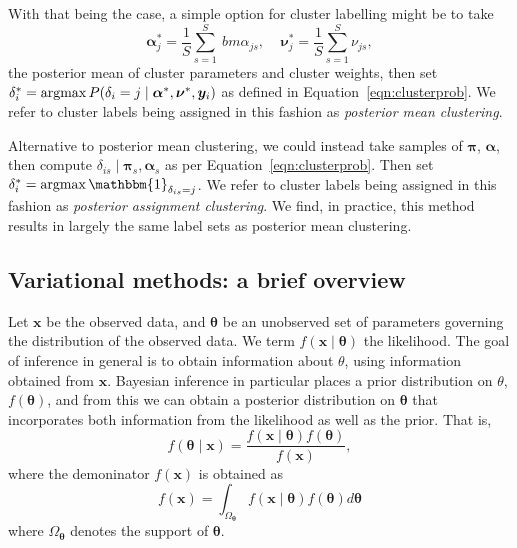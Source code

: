 With that being the case, a simple option for cluster labelling might be to take
    \[
        \bm{\alpha}_j^* = \frac{1}{S}\sum_{s = 1}^S\ bm{\alpha}_{js},\;\;\;\;
        \bm{\nu}_j^* = \frac{1}{S}\sum_{s = 1}^S \nu_{js},
    \]
    the posterior mean of cluster parameters and cluster weights, then set
    $\delta_i^{*} = \operatorname*{argmax} P(\delta_i = j\mid\bm{\alpha}^*,\bm{\nu}^*,\bm{y}_i)$
    as defined in Equation~\eqref{eqn:clusterprob}. We refer to cluster labels
    being assigned in this fashion as \emph{posterior mean clustering}.

Alternative to posterior mean clustering, we could instead take samples of 
    $\bm{\pi}$, $\bm{\alpha}$, then compute 
    $\delta_{is}\mid\bm{\pi}_s,\bm{\alpha}_s$
    as per Equation~\eqref{eqn:clusterprob}.  Then set 
    $\delta_i^{*} = \argmax \mathbbm{1}_{\delta_{is} = j}$.
    We refer to cluster labels being assigned in this fashion as
    \emph{posterior assignment clustering}.  We find, in practice, this method
    results in largely the same label sets as posterior mean clustering.

























\subsection{Variational methods: a brief overview\label{ref:varbayes}}
Let $\bm{x}$ be the observed data, and $\bm{\theta}$ be an unobserved set of 
    parameters governing the distribution of the observed data.  We term 
    $f(\bm{x}\mid\bm{\theta})$ the likelihood.  The goal of inference in 
    general is to obtain information about $\theta$, using information 
    obtained from $\bm{x}$. Bayesian inference in particular places a prior
    distribution on $\theta$, $f(\bm{\theta})$, and from this we can obtain a
    posterior distribution on $\bm{\theta}$ that incorporates both information
    from the likelihood as well as the prior.  That is,
    \[
        f(\bm{\theta}\mid\bm{x}) = 
            \frac{f(\bm{x}\mid\bm{\theta})f(\bm{\theta})}{f(\bm{x})},
    \]
    where the demoninator $f(\bm{x})$ is obtained as
    \[
        f(\bm{x}) = \int_{\Omega_{\bm{\theta}}}f(\bm{x}\mid\bm{\theta})f(\bm{\theta})d\bm{\theta}
    \]
    where $\Omega_{\bm{\theta}}$ denotes the support of $\bm{\theta}$.

